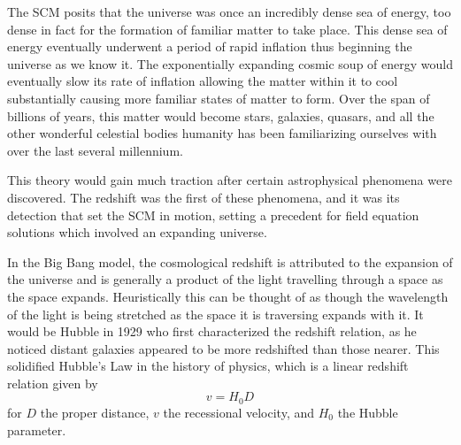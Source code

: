 \documentclass[a4paper]{article}
\begin{document}

    The SCM posits that the universe was once an incredibly dense sea of
    energy, too dense in fact for the formation of familiar matter to take
    place. This dense sea of energy eventually underwent a period of rapid
    inflation thus beginning the universe as we know it. The exponentially
    expanding cosmic soup of energy would eventually slow its rate of
    inflation allowing the matter within it to cool substantially causing more
    familiar states of matter to form. Over the span of billions of years, this
    matter would become stars, galaxies, quasars, and all the other
    wonderful celestial bodies humanity has been familiarizing ourselves with
    over the last several millennium.

    This theory would gain much traction after certain astrophysical phenomena
    were discovered. The redshift was the first of these phenomena,
    and it was its detection that set the SCM in motion, setting a precedent
    for field equation solutions which involved an expanding universe.

    In the Big Bang model,
    the cosmological redshift is attributed to the expansion of the universe
    and is generally a product of the light travelling through a space as the
    space expands. Heuristically this can be thought of as though the
    wavelength of the light is being stretched as the space it is traversing
    expands with it. It would be Hubble in 1929 who first characterized
    the redshift relation, as he noticed distant galaxies appeared to be more
    redshifted than those nearer. This solidified Hubble's Law in the history
    of physics, which is a linear redshift relation given by 
    \begin{equation}
        v = H_0D
    \end{equation}
    for $D$ the proper distance, $v$ the recessional velocity, and $H_0$ the
    Hubble parameter. 
\end{document}
